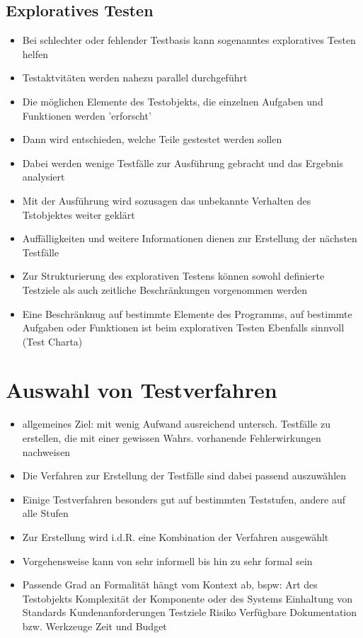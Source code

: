 \documentclass{report}
\theoremstyle{definition}
\theoremstyle{example}
\begin{document}
\subsection{Exploratives Testen}
\begin{itemize}
   \item Bei schlechter oder fehlender Testbasis kann sogenanntes exploratives Testen helfen
   \item Testaktvitäten werden nahezu parallel durchgeführt
   \item Die möglichen Elemente des Testobjekts, die einzelnen Aufgaben und Funktionen werden 'erforscht'
   \item Dann wird entschieden, welche Teile gestestet werden sollen
   \item Dabei werden wenige Testfälle zur Ausführung gebracht und das Ergebnis analysiert
   \item Mit der Ausführung wird sozusagen das unbekannte Verhalten des Tstobjektes weiter geklärt
   \item Auffälligkeiten und weitere Informationen dienen zur Erstellung der nächsten Testfälle
   \item Zur Strukturierung des explorativen Testens können sowohl definierte Testziele als auch zeitliche Beschränkungen vorgenommen werden
   \item Eine Beschränknug auf bestimmte Elemente des Programms, auf bestimmte Aufgaben oder Funktionen ist beim explorativen Testen Ebenfalls sinnvoll (Test Charta)
\end{itemize}

\section{Auswahl von Testverfahren}
\begin{itemize}
   \item allgemeines Ziel: mit wenig Aufwand ausreichend untersch. Testfälle zu erstellen, die mit einer gewissen Wahrs. vorhanende Fehlerwirkungen nachweisen
   \item Die Verfahren zur Erstellung der Testfälle sind dabei passend auszuwählen
   \item Einige Testverfahren besonders gut auf bestimmten Teststufen, andere auf alle Stufen
   \item Zur Erstellung wird i.d.R. eine Kombination der Verfahren ausgewählt
   \item Vorgehensweise kann von sehr informell bis hin zu sehr formal sein
   \item Passende Grad an Formalität hängt vom Kontext ab, bspw:
   \subitem Art des Testobjekts
   \subitem Komplexität der Komponente oder des Systems
   \subitem Einhaltung von Standards
   \subitem Kundenanforderungen
   \subitem Testziele
   \subitem Risiko
   \subitem Verfügbare Dokumentation bzw. Werkzeuge
   \subitem Zeit und Budget 
\end{itemize}
\end{document}

